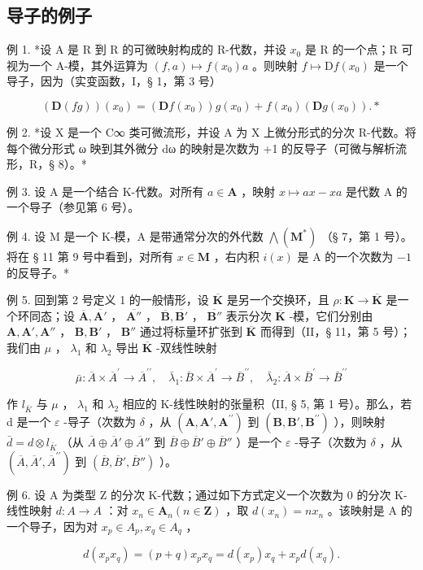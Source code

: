 \subsection{导子的例子}

例 1. *设 A 是 R 到 R 的可微映射构成的 R-代数，并设 \(x_0\) 是 R 的一个点；R 可视为一个 A-模，其外运算为 \((f, a) \mapsto f(x_0)a\) 。则映射 \(f \mapsto \mathrm{D}f(x_0)\) 是一个导子，因为（实变函数，I，§ 1，第 3 号）

\[
(\mathbf {D} (f g)) (x _ {0}) = (\mathbf {D} f (x _ {0})) g (x _ {0}) + f (x _ {0}) (\mathbf {D} g (x _ {0})). *
\]

例 2. *设 X 是一个 C∞ 类可微流形，并设 A 为 X 上微分形式的分次 R-代数。将每个微分形式 ω 映到其外微分 dω 的映射是次数为 +1 的反导子（可微与解析流形，R，§ 8）。*

例 3. 设 A 是一个结合 K-代数。对所有 \(a \in \mathbf{A}\) ，映射 \(x \mapsto ax - xa\) 是代数 A 的一个导子（参见第 6 号）。

例 4. 设 M 是一个 K-模，A 是带通常分次的外代数 \(\bigwedge (\mathbf{M}^{*})\) （§ 7，第 1 号）。将在 § 11 第 9 号中看到，对所有 \(x\in \mathbf{M}\) ，右内积 \(i(x)\) 是 A 的一个次数为 \(-1\) 的反导子。*

例 5. 回到第 2 号定义 1 的一般情形，设 \(\overline{\mathbf{K}}\) 是另一个交换环，且 \(\rho: \mathbf{K} \to \overline{\mathbf{K}}\) 是一个环同态；设 \(\overline{\mathbf{A}}, \overline{\mathbf{A}'}\) ， \(\overline{\mathbf{A}''}\) ， \(\overline{\mathbf{B}}, \overline{\mathbf{B}'}\) ， \(\overline{\mathbf{B}''}\) 表示分次 \(\overline{\mathbf{K}}\) -模，它们分别由 \(\mathbf{A}, \mathbf{A}', \mathbf{A}''\) ， \(\mathbf{B}, \mathbf{B}'\) ， \(\mathbf{B}''\) 通过将标量环扩张到 \(\overline{\mathbf{K}}\) 而得到（II，§ 11，第 5 号）；我们由 \(\mu\) ， \(\lambda_1\) 和 \(\lambda_2\) 导出 \(\overline{\mathbf{K}}\) -双线性映射

\[
\bar {\mu}: \overline {{{A}}} \times \overline {{{A}}} ^ {\prime} \rightarrow \overline {{{A}}} ^ {\prime \prime}, \quad \bar {\lambda} _ {1}: \bar {B} \times \overline {{{A}}} ^ {\prime} \rightarrow \bar {B} ^ {\prime \prime}, \quad \bar {\lambda} _ {2}: \overline {{{A}}} \times \bar {B} ^ {\prime} \rightarrow \bar {B} ^ {\prime \prime}
\]

作 \(l_{\bar{K}}\) 与 \(\mu\) ， \(\lambda_{1}\) 和 \(\lambda_{2}\) 相应的 K-线性映射的张量积（II, § 5, 第 1 号）。那么，若 d 是一个 \(\varepsilon\) -导子（次数为 \(\delta\) ，从 \((\mathbf{A}, \mathbf{A}', \mathbf{A}^{\prime\prime})\) 到 \((\mathbf{B}, \mathbf{B}', \mathbf{B}^{\prime\prime})\) ），则映射 \(\bar{d} = d \otimes l_{\bar{K}}\) （从 \(\overline{A} \oplus \overline{A}' \oplus \overline{A}''\) 到 \(\overline{B} \oplus \overline{B}' \oplus \overline{B}''\) ）是一个 \(\varepsilon\) -导子（次数为 \(\delta\) ，从 \((\overline{A}, \overline{A}', \overline{A}^{\prime\prime})\) 到 \((\overline{B}, \overline{B}', \overline{B}'' )\) ）。

例 6. 设 A 为类型 Z 的分次 K-代数；通过如下方式定义一个次数为 0 的分次 K-线性映射 \(d: A \to A\) ：对 \(x_{n} \in \mathbf{A}_{n}(n \in \mathbf{Z})\) ，取 \(d(x_{n}) = nx_{n}\) 。该映射是 A 的一个导子，因为对 \(x_{p} \in A_{p}, x_{q} \in A_{q}\) ，

\[
d (x _ {p} x _ {q}) = (p + q) x _ {p} x _ {q} = d (x _ {p}) x _ {q} + x _ {p} d (x _ {q}).
\]

